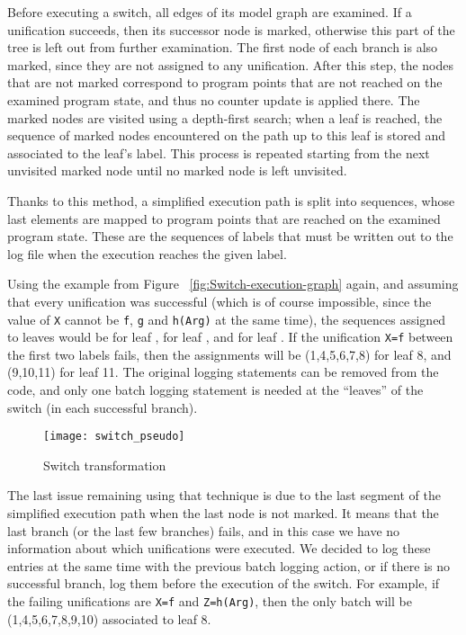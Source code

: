 \documentclass[british]{llncs}
\begin{document}
Before executing a switch, all edges of its model graph are examined.
If a unification succeeds, then
its successor node is marked, otherwise this part of the tree is left
out from further examination. The first node of each branch is also marked, since they are not assigned to any unification.
After this step, the nodes that
are not marked correspond to program points that are not reached on
the examined program state, and thus no counter update is applied
there. 
The marked nodes are visited using a depth-first search; when a leaf is reached, the sequence of marked nodes encountered on the path up to this leaf is stored and associated to the leaf's label. This process is repeated starting from the next unvisited marked node until no marked node is left unvisited.


Thanks to this method, a simplified execution path is split into sequences, whose last elements
are mapped to program points that are reached on the examined program
state. These are the sequences of labels that must be written out
to the log file when the execution reaches the given label. 

Using the example from Figure~ \ref{fig:Switch-execution-graph} again, and assuming that every unification was successful (which
is of course impossible, since the value of \texttt{X} cannot be \texttt{f},
\texttt{g} and \texttt{h(Arg)} at the same time), the sequences
assigned to leaves would be  for leaf ,  for leaf , and  for leaf .
If the unification \texttt{X=f} between the first two labels fails,
then the assignments will be (1,4,5,6,7,8) for leaf 8, and (9,10,11) for leaf 11. The original
logging statements can be removed from the code, and only one batch logging
statement is needed at the {}``leaves'' of the switch (in each successful
branch).

\begin{figure}
\begin{centering}
\texttt{[image: switch\_pseudo]} 
\par\end{centering}

\caption{\label{fig:Switch-transformation}Switch transformation}

\end{figure}


The last issue remaining using that technique is due to the last segment of the simplified
execution path when the last node is not marked. It means that the
last branch (or the last few branches) fails, and in this case we
have no information about which unifications were executed. We
decided to log these entries at the same time with the previous batch
logging action, or if there is no successful branch, log
them before the execution of the switch. For example, if the failing
unifications are \texttt{X=f} and \texttt{Z=h(Arg)}, then the only
batch will be (1,4,5,6,7,8,9,10) associated to leaf 8. 
\end{document}

